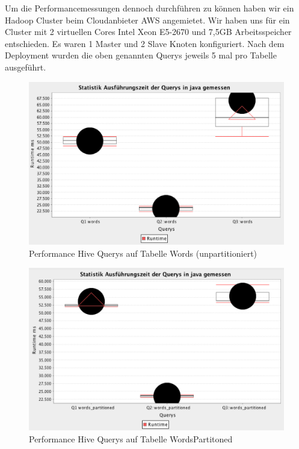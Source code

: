 \documentclass[a4paper, 11pt]{scrartcl}
\begin{document}
Um die Performancemessungen dennoch durchführen zu können haben wir  ein Hadoop Cluster beim Cloudanbieter AWS angemietet. Wir haben uns für ein Cluster mit 2 virtuellen Cores  Intel Xeon E5-2670 und 7,5GB Arbeitsspeicher entschieden. Es waren 1 Master und 2 Slave Knoten konfiguriert. Nach dem Deployment wurden die oben genannten Querys jeweils 5 mal pro Tabelle ausgeführt.

\begin{figure}[htb]
\includegraphics[scale=0.5]{PerformanceHiveInMsWords.png}
\centering
\caption{Performance Hive Querys auf Tabelle Words (unpartitioniert)}
\label{fig:PerfWords}
\end{figure}

\begin{figure}[htb]
\includegraphics[scale=0.5]{PerformanceHiveInMsWordsPartitioned.png}
\centering
\caption{Performance Hive Querys auf Tabelle WordsPartitoned}
\label{fig:PerfWordsPar}
\end{figure}
\end{document}

